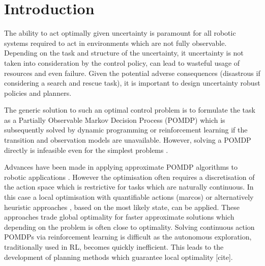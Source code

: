 \documentclass[final,5p,times,twocolumn]{elsarticle}
\begin{document}
%
%
%



\section{Introduction}

The ability to act optimally given uncertainty is paramount for all robotic systems required 
to act in environments which are not fully observable. Depending on the task and structure of the uncertainty, 
it uncertainty is not taken into consideration by the control policy, can lead to wasteful usage of resources 
and even failure. Given the potential adverse consequences (disastrous if considering a search and rescue task), 
it is important to design uncertainty robust policies and planners.

The generic solution to such an optimal control problem is to formulate the task as a
Partially Observable Markov Decision Process (POMDP) which is subsequently solved by dynamic programming
or reinforcement learning if the transition and observation models are unavailable. 
However, solving a POMDP directly is infeasible even for the simplest problems \cite{PBVI}. 

Advances have been made in applying approximate POMDP algorithms to robotic applications
\cite{pomdp_peg_icra_2014}. However the optimisation often requires a discretisation of the 
action space which is restrictive for tasks which are naturally continuous. In this case
a local optimisation with quantifiable actions (marcos) \cite{toussain_2015} or alternatively heuristic 
approaches \cite{Lauri2016}, based on the most likely state, can be applied. 
These approaches trade global optimality for faster approximate solutions which depending on 
the problem is often close to optimality. Solving continuous action POMDPs via reinforcement learning 
is difficult as the autonomous exploration, traditionally used in RL, becomes quickly inefficient. 
This leads to the development of planning methods which guarantee local optimality [cite]. 
\end{document}
